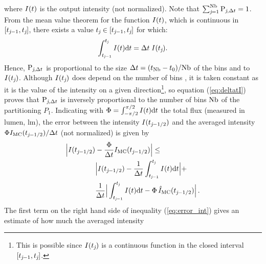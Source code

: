 where $I(t)$ is the output intensity (not normalized).
Note that $\sum_{\textit{j}=1}^{\textrm{Nb}}\textrm{P}_{\textit{j}, \Delta t}=1$. From the mean value theorem for the function
$I(t)$, which is continuous in $[t_{\textit{j}-1}, t_{\textit{j}}]$, there exists a value $t_{\textit{j}}\in[t_{\textit{j}-1}, t_{\textit{j}}]$ for which:
 \begin{equation}\label{eq:deltatI}
\int_{t_{\textit{j}-1}}^{t_{\textit{j}}} I(t) \textrm{d}t = \Delta t\;I(t_{\textit{j}}).
\end{equation}
Hence, $\textrm{P}_{\textit{j}, \Delta t}$ is proportional to the size $\Delta t= (t_{\textrm{Nb}}-t_{0})/{\textrm{Nb}}$
of the bins and to $I(t_{\textit{j}})$. Although $I(t_{\textit{j}})$ does depend on the number of bins \nbin, it is taken constant as it is the value of the intensity on a given direction\footnote{This is possible since $I(t_{\textit{j}})$ is a continuous function in the closed interval $[t_{\textit{j}-1}, t_{\textit{j}}]$.}, so equation (\ref{eq:deltatI}) proves that $\textrm{P}_{\textit{j}, \Delta t}$ is inversely proportional to the number of bins $\textrm{Nb}$ of the partitioning $P_1$.
Indicating with $\Phi = \int_{-\pi/2}^{\pi/2}I(t) \textrm{d}t$ the total flux (measured in lumen, $\textrm{lm}$),
the error between the intensity $I(t_{\textit{j}-1/2})$
 and the averaged  intensity $\Phi I_{\textrm{MC}}(t_{\textit{j}-1/2})/\Delta t$ (not normalized) is given by
\begin{equation}\label{eq:error_int}
\begin{aligned}
\Big|I(t_{\textit{j}-1/2})&-\frac{\Phi}
{\Delta t}I_{\textrm{MC}}(t_{\textit{j}-1/2})\Big| \leq\\
 &\Big|I(t_{\textit{j}-1/2})-\frac{1}{\Delta t}\int_{t_{\textit{j}-1}}^{t_{\textit{j}}} I(t)\textrm{d}t\Big|+\\
&\frac{1}{\Delta t}\Big|\int_{t_{\textit{j}-1}}^{t_{\textit{j}}} I(t)\textrm{d}t-
\Phi\, \hat{I}_{\textrm{MC}}(t_{\textit{j}-1/2})\Big| \,.
\end{aligned}
\end{equation}
\indent The first term on the right hand side of inequality (\ref{eq:error_int}) gives an estimate of how much the averaged intensity
